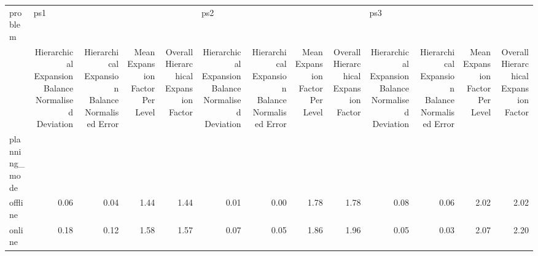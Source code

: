 \begin{tabular}{lrrrrrrrrrrrr}
\toprule
problem & \multicolumn{4}{l}{ps1} & \multicolumn{4}{l}{ps2} & \multicolumn{4}{l}{ps3} \\
{} & Hierarchical Expansion Balance Normalised Deviation & Hierarchical Expansion Balance Normalised Error & Mean Expansion Factor Per Level & Overall Hierarchical Expansion Factor & Hierarchical Expansion Balance Normalised Deviation & Hierarchical Expansion Balance Normalised Error & Mean Expansion Factor Per Level & Overall Hierarchical Expansion Factor & Hierarchical Expansion Balance Normalised Deviation & Hierarchical Expansion Balance Normalised Error & Mean Expansion Factor Per Level & Overall Hierarchical Expansion Factor \\
planning\_mode &                                                     &                                                 &                                 &                                       &                                                     &                                                 &                                 &                                       &                                                     &                                                 &                                 &                                       \\
\midrule
offline       &                                               0.06 &                                            0.04 &                            1.44 &                                  1.44 &                                               0.01 &                                            0.00 &                            1.78 &                                  1.78 &                                               0.08 &                                            0.06 &                            2.02 &                                  2.02 \\
online        &                                               0.18 &                                            0.12 &                            1.58 &                                  1.57 &                                               0.07 &                                            0.05 &                            1.86 &                                  1.96 &                                               0.05 &                                            0.03 &                            2.07 &                                  2.20 \\
\bottomrule
\end{tabular}
